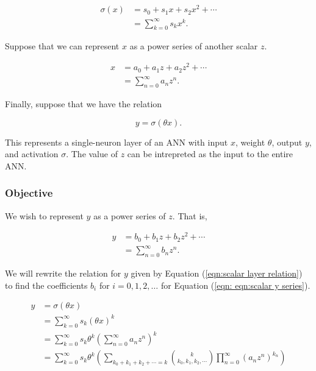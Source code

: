 \begin{align}
    \sigma(x)
    &= s_0 + s_1 x + s_2 x^2 + \cdots \nonumber \\
	&= \sum_{k=0}^{\infty} s_{k} x^{k}.
	\label{eqn:scalar layer activation}
\end{align}

Suppose that we can represent $x$ as a power series of another scalar $z$.

\begin{align}
    x
    &= a_0 + a_1 z + a_2 z^2 + \cdots \nonumber \\
	&= \sum_{n=0}^{\infty} a_{n} z^{n}.
	\label{eqn:scalar x series}
\end{align}

Finally, suppose that we have the relation

\begin{equation}
	y = \sigma(\theta x).
	\label{eqn:scalar layer relation}
\end{equation}

This represents a single-neuron layer of an ANN with input $x$, weight $\theta$, output $y$, and activation $\sigma$. The value of $z$ can be intrepreted as the input to the entire ANN.

\subsubsection{Objective}
We wish to represent $y$ as a power series of $z$. That is,

\begin{align}
    y
    &= b_0 + b_1 z + b_2 z^2 + \cdots \nonumber \\
	&= \sum_{n=0}^{\infty} b_{n} z^{n}.
	\label{eqn:scalar y series}
\end{align}

We will rewrite the relation for $y$ given by Equation (\ref{eqn:scalar layer relation}) to find the coefficients $b_i$ for $i = 0, 1, 2, \ldots$ for Equation (\ref{eqn: eqn:scalar y series}).

\begin{align}
    y
    &= \sigma(\theta x) \nonumber \\
    &= \sum_{k=0}^{\infty} s_k (\theta x)^k \nonumber \\
    &= \sum_{k=0}^{\infty} s_k \theta^k \left(\sum_{n=0}^{\infty} a_{n} z^{n}\right)^{k} \nonumber \\
	&= \sum_{k=0}^{\infty} s_k \theta^k \left(\sum_{k_0 + k_1 + k_2 + \cdots = k} \binom{k}{k_0, k_1, k_2, \cdots} \prod_{n=0}^{\infty} (a_n z^{n})^{k_n} \right)
	\label{eqn:scalar y expansion}
\end{align}

